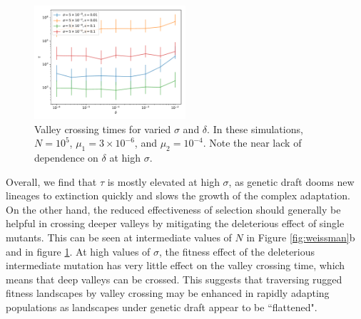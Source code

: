 \documentclass[10pt,twocolumn,twoside]{gsajnl}
\begin{document}
\begin{spacing}{1.5}
\begin{figure}[t]
\includegraphics[width=0.5\textwidth]{Figures/julia_sigma_delta.pdf}
\caption{Valley crossing times for varied $\sigma$ and $\delta$. In these simulations, $N = 10^5$, $\mu_1 = 3 \times 10^{-6}$, and $\mu_2 = 10^{-4}$. Note the near lack of dependence on $\delta$ at high $\sigma$.}
\label{fig:sigma_delta}
\end{figure}

Overall, we find that $\tau$ is mostly elevated at high $\sigma$, as genetic draft dooms new lineages to extinction quickly and slows the growth of the complex adaptation.
On the other hand, the reduced effectiveness of selection should generally be helpful in crossing deeper valleys by mitigating the deleterious effect of single mutants.
This can be seen at intermediate values of $N$ in Figure \ref{fig:weissman}b and in figure \ref{fig:sigma_delta}.
At high values of $\sigma$, the fitness effect of the deleterious intermediate mutation has very little effect on the valley crossing time, which means that deep valleys can be crossed.
This suggests that traversing rugged fitness landscapes by valley crossing may be enhanced in rapidly adapting populations as landscapes under genetic draft appear to be ``flattened".


\end{spacing}
\end{document}
